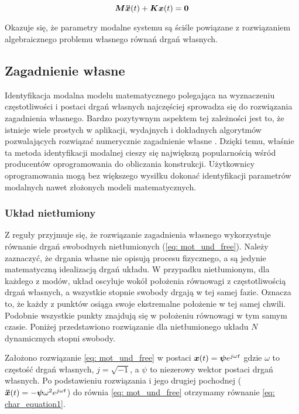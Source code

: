 \begin{equation} \label{eq: mot_und_free}
\bm{M} \bm{\ddot{x}}(t) +\bm{Kx}(t) = \bm{0}
\end{equation}


Okazuje się, że parametry modalne systemu są ściśle powiązane z rozwiązaniem algebraicznego problemu własnego równań drgań własnych. 

\subsection{Zagadnienie własne}
Identyfikacja modalna modelu matematycznego polegająca na wyznaczeniu częstotliwości i postaci drgań własnych najczęściej sprowadza się do rozwiązania zagadnienia własnego. Bardzo pozytywnym aspektem tej zależności jest to, że istnieje wiele prostych w aplikacji, wydajnych i dokładnych algorytmów pozwalających rozwiązać numerycznie zagadnienie własne \parencite{Golub2013}. Dzięki temu, właśnie ta metoda identyfikacji modalnej cieszy się największą popularnością wśród producentów oprogramowania do obliczania konstrukcji. Użytkownicy oprogramowania mogą bez większego wysiłku dokonać identyfikacji parametrów modalnych nawet złożonych modeli matematycznych. 
\subsubsection{Układ nietłumiony}
Z reguły przyjmuje się, że rozwiązanie zagadnienia własnego wykorzystuje równanie drgań swobodnych nietłumionych (\ref{eq: mot_und_free}). Należy zaznaczyć, że drgania własne nie opisują procesu fizycznego, a są jedynie matematyczną idealizacją drgań układu. W przypadku nietłumionym, dla każdego z modów, układ oscyluje wokół położenia równowagi z częstotliwością drgań własnych, a wszystkie stopnie swobody drgają w tej samej fazie. Oznacza to, że każdy z punktów osiąga swoje ekstremalne położenie w tej samej chwili. Podobnie wszystkie punkty znajdują się w położeniu równowagi w tym samym czasie. Poniżej przedstawiono rozwiązanie dla nietłumionego układu $N$ dynamicznych stopni swobody.

Założono rozwiązanie \ref{eq: mot_und_free} w postaci $\bm{x}(t)=\bm{\psi}e^{j\omega t}$ gdzie $\omega$ to częstość drgań własnych, $j=\sqrt{-1}$, a $\psi$ to niezerowy wektor postaci drgań własnych. Po podstawieniu rozwiązania i jego drugiej pochodnej ($\bm{\ddot{x}}(t)=-\bm{\psi} \omega^2 e^{j\omega t}$) do równia \ref{eq: mot_und_free} otrzymamy równanie \ref{eq: char_equation1}.


